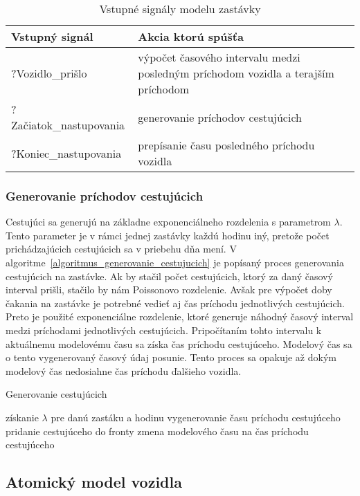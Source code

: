 \begin{table}[h]\label{tab:inputs_zastavky}
  \centering
  \begin{tabularx}{\textwidth}{|l|X|}
    \hline
    \textbf{Vstupný signál} & \textbf{Akcia ktorú spúšťa} \\ \hline
    ?Vozidlo\_prišlo & výpočet časového intervalu medzi posledným príchodom vozidla a terajším príchodom\\ \hline
    ?Začiatok\_nastupovania & generovanie príchodov cestujúcich \\ \hline
    ?Koniec\_nastupovania & prepísanie času posledného príchodu vozidla \\ \hline
  \end{tabularx}
  \caption{Vstupné signály modelu zastávky}
\end{table}

\subsubsection*{Generovanie príchodov cestujúcich}
Cestujúci sa generujú na základne exponenciálneho rozdelenia s parametrom $\lambda$.
Tento parameter je v rámci jednej zastávky každú hodinu iný, pretože počet prichádzajúcich cestujúcich sa v priebehu dňa mení.
V algoritme~\ref{algoritmus_generovanie_cestujucich} je popísaný proces generovania cestujúcich na zastávke.
Ak by stačil počet cestujúcich, ktorý za daný časový interval prišli, stačilo by nám Poissonovo rozdelenie.
Avšak pre výpočet doby čakania na zastávke je potrebné vedieť aj čas príchodu jednotlivých cestujúcich.
Preto je použité exponenciálne rozdelenie, ktoré generuje náhodný časový interval medzi príchodami jednotlivých cestujúcich.
Pripočítaním tohto intervalu k aktuálnemu modelovému času sa získa čas príchodu cestujúceho.
Modelový čas sa o tento vygenerovaný časový údaj posunie.
Tento proces sa opakuje až dokým modelový čas nedosiahne čas príchodu ďalšieho vozidla.

\vspace*{\dimexpr0.5\baselineskip\relax}
\begin{algorithm}[H]\label{algoritmus_generovanie_cestujucich}
\caption{Generovanie cestujúcich}
  získanie $\lambda$ pre danú zastáku a hodinu\;
   {
    vygenerovanie času príchodu cestujúceho\;
    pridanie cestujúceho do fronty\;
    zmena modelového času na čas príchodu cestujúceho\;
  }
\end{algorithm}

\newpage
\subsection*{Atomický model vozidla}\label{model_vozidla}

